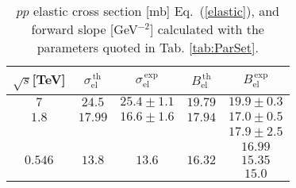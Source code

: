 \documentclass[12pt]{article}
\begin{document}
 \begin{table}[p] %
  \centering
  \caption{\label{tab:cs.el} $pp$ elastic cross section [mb]  Eq.~(\ref{elastic}), and forward slope [GeV$^{-2}$] calculated with the parameters quoted in Tab. \ref{tab:ParSet}.}
    \begin{tabular}{|c||c|c||c|c|}
      \hline
$\sqrt{s}$[TeV]&$\sigma_\mathrm{el}^{\mathrm{\,th}}$&$\sigma_\mathrm{el}^{\mathrm{\,exp}}$
                                                              &$B_\mathrm{el}^{\mathrm{\,th} }$&$B_\mathrm{el}^{\mathrm{\,exp} }$ \\ \hline
          $7$  &   $24.5$ &$25.4\pm1.1$ \cite{[T1].TOTEM}          &$19.79$&$19.9 \pm0.3$ \cite{[T1].TOTEM}         \\ \hline
          $1.8$&   $17.99$&$16.6\pm1.6$ \cite{[tmp3]Amos.E710.[3]} &$17.94$&$17.0 \pm0.5$ \cite{[tmp3]Amos.E710.[3]}\\
               &          &                                        &       &$17.9 \pm2.5$ \cite{[tmp3]Amos.E710.[5]}\\
               &          &                                        &       &$16.99$       \cite{Abe.CDF.1993}      \\ \hline
        $0.546$&   $13.8$ &$13.6$      \cite{Bozzo1}               &$16.32$&$15.35$       \cite{Abe.CDF.1993}      \\
               &          &                                        &       &$15.0$ \cite{[tmp6].Ansorge.UA5}        \\ \hline
    \end{tabular}
 \end{table}
\end{document}
